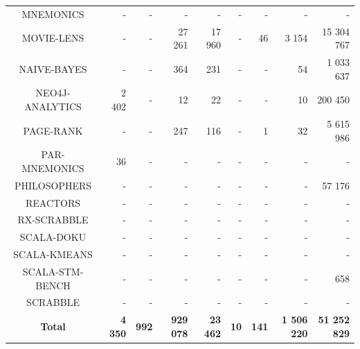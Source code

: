 \documentclass[]{usiinfthesis}
\begin{document}
\begin{table}
\begin{tabular}{|c|r|r|r|r|r|r|r|r|}
	 MNEMONICS 	 & 	 -   	 & 	 -   	 & 	 -   	 & 	 -   	 & 	 -   	 & 	 -   	 & 	 -   	 & 	 -   	 \\ 
	 MOVIE-LENS 	 & 	 -   	 & 	 -   	 & 	 27 261 	 & 	 17 960 	 & 	 -   	 & 	 46 	 & 	 3 154 	 & 	 15 304 767 	 \\ 
	 NAIVE-BAYES 	 & 	 -   	 & 	 -   	 & 	 364 	 & 	 231 	 & 	 -   	 & 	 -   	 & 	 54 	 & 	 1 033 637 	 \\ 
	 NEO4J-ANALYTICS 	 & 	 2 402 	 & 	 -   	 & 	 12 	 & 	 22 	 & 	 -   	 & 	 -   	 & 	 10 	 & 	 200 450 	 \\ 
	 PAGE-RANK 	 & 	 -   	 & 	 -   	 & 	 247 	 & 	 116 	 & 	 -   	 & 	 1 	 & 	 32 	 & 	 5 615 986 	 \\ 
	 PAR-MNEMONICS 	 & 	 36 	 & 	 -   	 & 	 -   	 & 	 -   	 & 	 -   	 & 	 -   	 & 	 -   	 & 	 -   	 \\ 
	 PHILOSOPHERS 	 & 	 -   	 & 	 -   	 & 	 -   	 & 	 -   	 & 	 -   	 & 	 -   	 & 	 -   	 & 	 57 176 	 \\ 
	 REACTORS 	 & 	 -   	 & 	 -   	 & 	 -   	 & 	 -   	 & 	 -   	 & 	 -   	 & 	 -   	 & 	 -   	 \\ 
	 RX-SCRABBLE 	 & 	 -   	 & 	 -   	 & 	 -   	 & 	 -   	 & 	 -   	 & 	 -   	 & 	 -   	 & 	 -   	 \\ 
	 SCALA-DOKU 	 & 	 -   	 & 	 -   	 & 	 -   	 & 	 -   	 & 	 -   	 & 	 -   	 & 	 -   	 & 	 -   	 \\ 
	 SCALA-KMEANS 	 & 	 -   	 & 	 -   	 & 	 -   	 & 	 -   	 & 	 -   	 & 	 -   	 & 	 -   	 & 	 -   	 \\ 
	 SCALA-STM-BENCH 	 & 	 -   	 & 	 -   	 & 	 -   	 & 	 -   	 & 	 -   	 & 	 -   	 & 	 -   	 & 	 658 	 \\ 
	 SCRABBLE 	 & 	 -   	 & 	 -   	 & 	 -   	 & 	 -   	 & 	 -   	 & 	 -   	 & 	 -   	 & 	 -   	 \\ 
	 \hline 																	
 \textbf{ 	 Total 	 }&\textbf{ 	 4 350 	 }&\textbf{ 	 992 	 }&\textbf{ 	 929 078 	 }&\textbf{ 	 23 462 	 }&\textbf{ 	 10 	 }&\textbf{ 	 141 	 }&\textbf{ 	 1 506 220 	 }&\textbf{ 	 51 252 829 	 }\\\hline 
\end{tabular}
\end{table}%
\end{document}
